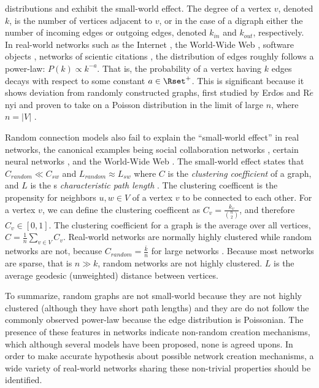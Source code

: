 \documentclass{elsart}
\begin{document}
distributions and exhibit the small-world effect. The degree of a vertex $v$, denoted $k$, is the number of 
vertices adjacent to $v$, or in the case of a digraph  either the number of incoming edges or outgoing edges, 
denoted $k_{in}$ and $k_{out}$, respectively. In real-world networks such as the Internet \cite{FFF99}, the 
World-Wide Web \cite{AJB99}, software objects \cite{CMy03,PNF04,WC03,VS04}, networks of scientic citations 
\cite{LLJ03,SRe98}, the distribution of edges roughly follows a power-law: $P(k) 
\propto k^{ - a} $. That is, the probability of a vertex having $k$ edges decays with respect to some 
constant $a \in \Rset^+$. This is significant because it shows deviation from randomly constructed graphs, first 
studied by Erd$\ddot{o}$s and R$\acute{e}$nyi and proven to take on a Poisson distribution in the limit of large $n$, where 
$n=|V|$ \cite{BBo85}. 
\par Random connection models also fail to explain the ``small-world effect'' in real networks, the canonical 
examples being social collaboration networks \cite{MNe00,MNe04}, 
certain neural networks \cite{WS98}, and the World-Wide Web \cite{AJB99}.  The small-world effect states that 
$C_{random} \ll C_{sw}$ and $L_{random}\approx L_{sw}$ where $C$ is the {\em clustering coefficient} of a graph, 
and $L$ is the s {\em characteristic path length} \cite{WS98}. The clustering coefficent is the propensity for 
neighbors $u,w \in V$ of a vertex $v$ to be connected to each other. For a vertex $v$, we can define the clustering coefficent as 
$C_v=\frac{k_v}{{n \choose 2}}$, and therefore $C_v \in [0,1]$. The clustering coefficient for a graph is the average 
over all vertices, $C=\frac{1}{n}\sum_{v \in V}{C_v}$. Real-world networks are normally highly clustered while random networks are not, 
because $C_{random} = \frac{\bar{k}}{n}$ for large networks \cite{BBo85}. Because most networks are sparse, that is 
$n \gg k$, random networks are not highly clustered. $L$ is the average geodesic (unweighted) distance between vertices. 
\par To summarize, random graphs are not small-world because they are not highly clustered (although they have 
short path lengths) and they are do not follow the commonly observed power-law  because the edge distribution is Poissonian. The presence of 
these features in networks indicate non-random creation mechanisms, which although several models have been proposed, 
none is agreed upons. In order to make accurate hypothesis about possible network creation mechanisms, a wide variety 
of real-world networks sharing these non-trivial properties should be identified.
\end{document}
